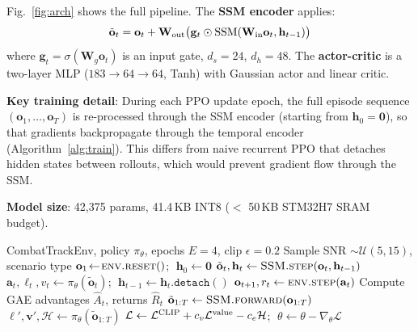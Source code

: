 \documentclass[conference]{IEEEtran}
\def\mat#1{\mathbf{#1}}
\def\vec#1{\mathbf{#1}}
\begin{document}
Fig.~\ref{fig:arch} shows the full pipeline.
The \textbf{SSM encoder} applies:
\begin{equation}
  \tilde{\vec{o}}_t = \vec{o}_t +
  \mat{W}_{\rm out}\bigl(\vec{g}_t \odot \mathrm{SSM}(
  \mat{W}_{\rm in}\vec{o}_t, \vec{h}_{t-1})\bigr)
  \label{eq:encoder}
\end{equation}
where $\vec{g}_t = \sigma(\mat{W}_g \vec{o}_t)$ is an input gate,
$d_s{=}24$, $d_h{=}48$.
The \textbf{actor-critic} is a two-layer MLP
($183{\to}64{\to}64$, Tanh) with Gaussian actor and linear critic.

\textbf{Key training detail}:
During each PPO update epoch, the full episode sequence
$(\vec{o}_1,\ldots,\vec{o}_T)$ is re-processed through the SSM
encoder (starting from $\vec{h}_0 = \vec{0}$), so that gradients
backpropagate through the temporal encoder (Algorithm~\ref{alg:train}).
This differs from naive recurrent PPO that detaches hidden states
between rollouts, which would prevent gradient flow through the SSM.

\textbf{Model size}: 42,375 params, 41.4\,KB INT8
($<$ 50\,KB STM32H7 SRAM budget).

\begin{algorithm}[t]
\caption{Mamba-COP-RL Training}
\label{alg:train}
\begin{algorithmic}[1]
\REQUIRE CombatTrackEnv, policy $\pi_\theta$, epochs $E{=}4$,
         clip $\epsilon{=}0.2$
  \STATE Sample SNR $\sim \mathcal{U}(5,15)$, scenario type
  \STATE $\vec{o}_1 \!\leftarrow\! \textsc{env.reset}()$;
         $\;\vec{h}_0 \leftarrow \vec{0}$
    \STATE $\tilde{\vec{o}}_t, \vec{h}_t \leftarrow
           \textsc{SSM.step}(\vec{o}_t, \vec{h}_{t-1})$
    \STATE $\vec{a}_t, \ell_t, v_t \leftarrow \pi_\theta(\tilde{\vec{o}}_t)$;
           $\;\vec{h}_{t-1} \leftarrow \vec{h}_t.\texttt{detach}()$
    \STATE $\vec{o}_{t+1}, r_t \leftarrow \textsc{env.step}(\vec{a}_t)$
  \ENDFOR
  \STATE Compute GAE advantages $\hat{A}_t$, returns $\hat{R}_t$
    \STATE $\tilde{\vec{o}}_{1:T} \leftarrow \textsc{SSM.forward}(\vec{o}_{1:T})$
    \STATE $\vec{\ell}', \vec{v}', \mathcal{H} \leftarrow
           \pi_\theta(\tilde{\vec{o}}_{1:T})$
    \STATE $\mathcal{L} \leftarrow \mathcal{L}^{\rm CLIP} +
           c_v \mathcal{L}^{\rm value} - c_e \mathcal{H}$;
           $\;\theta \leftarrow \theta - \nabla_\theta \mathcal{L}$
  \ENDFOR
\ENDFOR
\end{algorithmic}
\end{algorithm}
\end{document}
